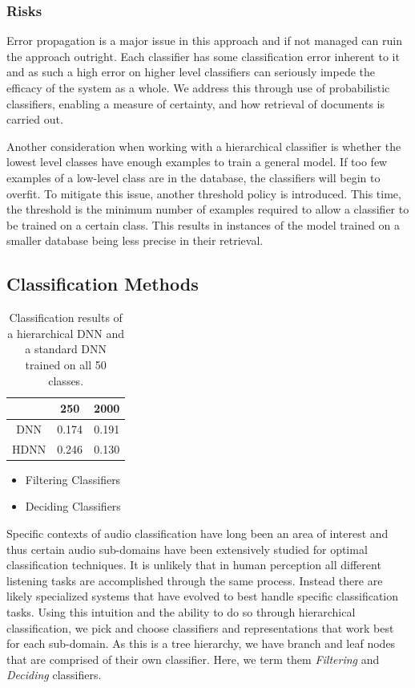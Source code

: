 \subsubsection{Risks}
Error propagation is a major issue in this approach and if not managed can ruin the approach outright. Each classifier has some classification error inherent to it and as such a high error on higher level classifiers can seriously impede the efficacy of the system as a whole. We address this through use of probabilistic classifiers, enabling a measure of certainty, and how retrieval of documents is carried out.

Another consideration when working with a hierarchical classifier is whether the lowest level classes have enough examples to train a general model. If too few examples of a low-level class are in the database, the classifiers will begin to overfit. To mitigate this issue, another threshold policy is introduced. This time, the threshold is the minimum number of examples required to allow a classifier to be trained on a certain class. This results in instances of the model trained on a smaller database being less precise in their retrieval.

\subsection{Classification Methods}

\begin{table}[t]
    \centering
    \begin{tabular}{ccc}
         & 250   & 2000  \\ \hline
    DNN  & 0.174 & 0.191 \\
    HDNN & 0.246 & 0.130
    \end{tabular}
    \caption{Classification results of a hierarchical DNN and a standard DNN trained on all 50 classes.}
    \label{tab:classifier}
\end{table}

\begin{itemize}
    \item Filtering Classifiers
    \item Deciding Classifiers
\end{itemize}
Specific contexts of audio classification have long been an area of interest and thus certain audio sub-domains have been extensively studied for optimal classification techniques. It is unlikely that in human perception all different listening tasks are accomplished through the same process. Instead there are likely specialized systems that have evolved to best handle specific classification tasks. Using this intuition and the ability to do so through hierarchical classification, we pick and choose classifiers and representations that work best for each sub-domain. As this is a tree hierarchy, we have branch and leaf nodes that are comprised of their own classifier. Here, we term them \textit{Filtering} and \textit{Deciding} classifiers.


